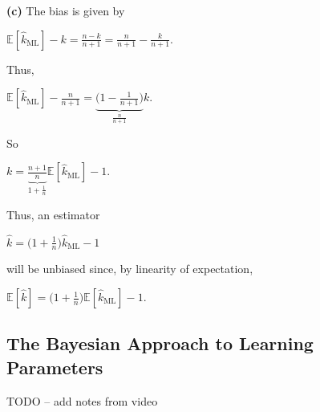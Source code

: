 \documentclass[6008notes.tex]{subfiles}
\begin{document}
\textbf{(c)} The bias is given by

{\centering$\mathbb {E}[\widehat{k}_{\text {ML}}]-k=\frac{n-k}{n+1}=\frac{n}{n+1}-\frac{k}{n+1}.$ \par}
 
Thus,

{\centering$\mathbb {E}[\widehat{k}_{\text {ML}}]-\frac{n}{n+1}=\underbrace{\Big(1-\frac{1}{n+1}\Big)}_{\frac{n}{n+1}}k.$ \par}
 
So

{\centering$k=\underbrace{\frac{n+1}{n}}_{1+\frac{1}{n}}\mathbb {E}[\widehat{k}_{\text {ML}}]-1.$ \par}
 
Thus, an estimator

{\centering$\widehat{k}=\Big(1+\frac{1}{n}\Big)\widehat{k}_{\text {ML}}-1$ \par}
 
will be unbiased since, by linearity of expectation,

{\centering$\mathbb {E}[\widehat{k}]=\Big(1+\frac{1}{n}\Big)\mathbb {E}[\widehat{k}_{\text {ML}}]-1.$ \par}


\subsection{The Bayesian Approach to Learning Parameters}

TODO -- add notes from video
\end{document}
